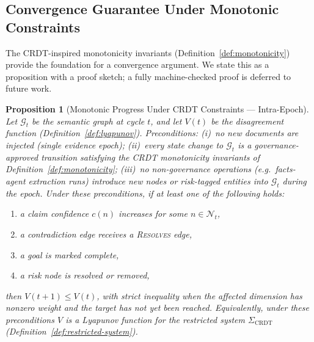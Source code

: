 \documentclass[11pt]{article}
\newtheorem{proposition}{Proposition}
\begin{document}
\subsection{Convergence Guarantee Under Monotonic Constraints}

The CRDT-inspired monotonicity invariants (Definition~\ref{def:monotonicity}) provide the foundation for a convergence argument. We state this as a proposition with a proof sketch; a fully machine-checked proof is deferred to future work.

\begin{proposition}[Monotonic Progress Under CRDT Constraints --- Intra-Epoch]
\label{prop:monotonic}
Let $\mathcal{G}_t$ be the semantic graph at cycle $t$, and let $V(t)$ be the disagreement function (Definition~\ref{def:lyapunov}). \emph{Preconditions:} (i)~no new documents are injected (single evidence epoch); (ii)~every state change to $\mathcal{G}_t$ is a governance-approved transition satisfying the CRDT monotonicity invariants of Definition~\ref{def:monotonicity}; (iii)~no non-governance operations (e.g.\ facts-agent extraction runs) introduce new nodes or risk-tagged entities into $\mathcal{G}_t$ during the epoch. Under these preconditions, if at least one of the following holds:
\begin{enumerate}
  \item a claim confidence $c(n)$ increases for some $n \in \mathcal{N}_t$,
  \item a contradiction edge receives a \textnormal{\textsc{Resolves}} edge,
  \item a goal is marked complete,
  \item a risk node is resolved or removed,
\end{enumerate}
then $V(t+1) \leq V(t)$, with strict inequality when the affected dimension has nonzero weight and the target has not yet been reached. Equivalently, under these preconditions $V$ is a Lyapunov function for the restricted system $\Sigma_{\mathrm{CRDT}}$ (Definition~\ref{def:restricted-system}).
\end{proposition}
\end{document}
